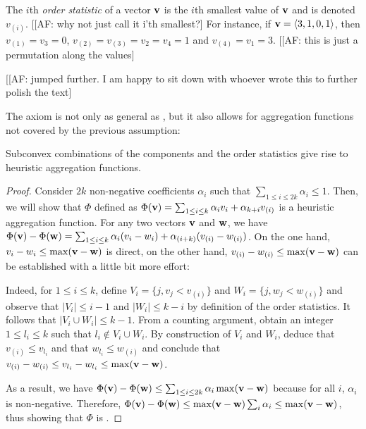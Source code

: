 The $i$th \emph{order statistic} of a vector $\mathbf{v}$ is the $i$th smallest value of $\mathbf{v}$ and is denoted $v_{(i)}$. [[AF: why not just call it i'th smallest?]
For instance, if $\mathbf{v} = \left \langle 3, 1, 0, 1 \right \rangle $, then $v_{(1)} = v_3 = 0$, $v_{(2)} = v_{(3)} = v_2 = v_4 = 1$ and $v_{(4)} = v_1 = 3$. [[AF: this is just a permutation along the values]

[[AF: jumped further. I am happy to sit down with whoever wrote this to further polish the text]

The \axiomcons axiom is not only as general as \axiomadm, but it also allows for aggregation functions not covered by the previous assumption:
\begin{theorem}
  \label{thm:subconvex}
  Subconvex combinations of the components and the order statistics give rise to \axiomcons heuristic aggregation functions.
\end{theorem}
\begin{proof}
  Consider $2k$ non-negative coefficients $\alpha_i$ such that $\sum_{1 \leq i \leq 2k} \alpha_i \leq 1$.
  Then, we will show that $\Phi$ defined as $\Phi(\mathbf{v}) = \sum_{1 \leq i \leq k} \alpha_i v_i + \alpha_{k+i} v_{(i)}$ is a heuristic aggregation function.
  For any two vectors $\mathbf{v}$ and $\mathbf{w}$, we have $\Phi(\mathbf{v}) - \Phi(\mathbf{w}) = \sum_{1 \leq i \leq k} \alpha_i (v_i - w_i) + \alpha_{(i+k)} (v_{(i)} - w_{(i)})$.
  On the one hand, $v_i - w_i \leq \max (\mathbf{v} - \mathbf{w})$ is direct, on the other hand, $v_{(i)} - w_{(i)} \leq \max (\mathbf{v} - \mathbf{w})$ can be established with a little bit more effort:

  Indeed, for $1 \leq i \leq k$, define $V_i = \{j, v_j < v_{(i)} \}$ and $W_i = \{j, w_j < w_{(i)} \}$ and observe that $|V_i| \leq i - 1$ and $|W_i| \leq k - i$ by definition of the order statistics.
  It follows that $|V_i \cup W_i| \leq k - 1$.
  From a counting argument, obtain an integer $1 \leq l_i \leq k$ such that $l_i \notin V_i \cup W_i$.
  By construction of $V_i$ and $W_i$, deduce that $v_{(i)} \leq v_{l_i}$ and that $w_{l_i} \leq w_{(i)}$ and conclude that $v_{(i)} - w_{(i)} \leq v_{l_i} - w_{l_i} \leq \max (\mathbf{v} - \mathbf{w})$.

  As a result, we have $\Phi(\mathbf{v}) - \Phi(\mathbf{w}) \leq \sum_{1 \leq i \leq 2k} \alpha_i \max(\mathbf{v} - \mathbf{w})$ because for all $i$, $\alpha_i$ is non-negative.
  Therefore, $\Phi(\mathbf{v}) - \Phi(\mathbf{w}) \leq \max(\mathbf{v} - \mathbf{w}) \sum_i \alpha_i \leq \max(\mathbf{v} - \mathbf{w})$, thus showing that $\Phi$ is \axiomcons.
\end{proof}

